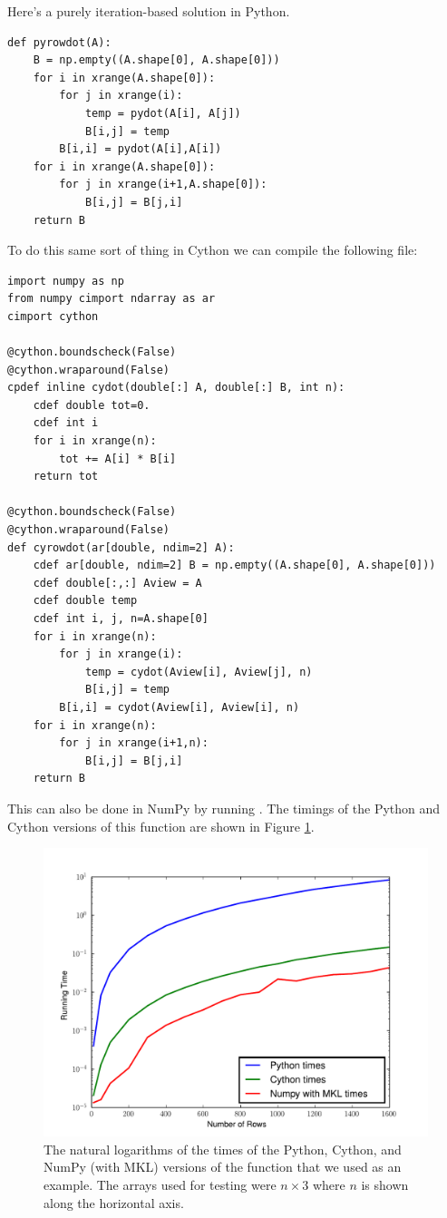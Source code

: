 Here's a purely iteration-based solution in Python.
\begin{lstlisting}
def pyrowdot(A):
    B = np.empty((A.shape[0], A.shape[0]))
    for i in xrange(A.shape[0]):
        for j in xrange(i):
            temp = pydot(A[i], A[j])
            B[i,j] = temp
        B[i,i] = pydot(A[i],A[i])
    for i in xrange(A.shape[0]):
        for j in xrange(i+1,A.shape[0]):
            B[i,j] = B[j,i]
    return B
\end{lstlisting}

To do this same sort of thing in Cython we can compile the following file:

\begin{lstlisting}
import numpy as np
from numpy cimport ndarray as ar
cimport cython

@cython.boundscheck(False)
@cython.wraparound(False)
cpdef inline cydot(double[:] A, double[:] B, int n):
    cdef double tot=0.
    cdef int i
    for i in xrange(n):
        tot += A[i] * B[i]
    return tot

@cython.boundscheck(False)
@cython.wraparound(False)
def cyrowdot(ar[double, ndim=2] A):
    cdef ar[double, ndim=2] B = np.empty((A.shape[0], A.shape[0]))
    cdef double[:,:] Aview = A
    cdef double temp
    cdef int i, j, n=A.shape[0]
    for i in xrange(n):
        for j in xrange(i):
            temp = cydot(Aview[i], Aview[j], n)
            B[i,j] = temp
        B[i,i] = cydot(Aview[i], Aview[i], n)
    for i in xrange(n):
        for j in xrange(i+1,n):
            B[i,j] = B[j,i]
    return B
\end{lstlisting}

This can also be done in NumPy by running .
The timings of the Python and Cython versions of this function are shown in Figure \ref{cython:rowdot}.

\begin{figure}
\centering
\includegraphics[width=\textwidth]{rowdot.pdf}
\caption{
The natural logarithms of the times of the Python, Cython, and NumPy (with MKL) versions of the  function that we used as an example.
The arrays used for testing were $n\times 3$ where $n$ is shown along the horizontal axis.
}
\label{cython:rowdot}
\end{figure}

